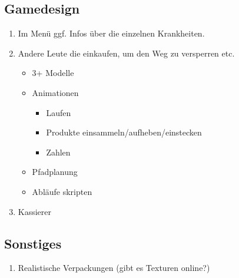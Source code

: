 \documentclass[a4paper, 11pt]{scrartcl}
\begin{document}
\subsection{Gamedesign}
\begin{enumerate}
    \item Im Menü ggf. Infos über die einzelnen Krankheiten.
    \item Andere Leute die einkaufen, um den Weg zu versperren etc.
    \begin{itemize}
        \item 3+ Modelle
        \item Animationen
        \begin{itemize}
            \item Laufen
            \item Produkte einsammeln/aufheben/einstecken
            \item Zahlen
        \end{itemize}
        \item Pfadplanung
        \item Abläufe skripten
    \end{itemize}
    \item Kassierer
\end{enumerate}


\subsection{Sonstiges}
\begin{enumerate}
    \item Realistische Verpackungen (gibt es Texturen online?)
\end{enumerate}
\end{document}
